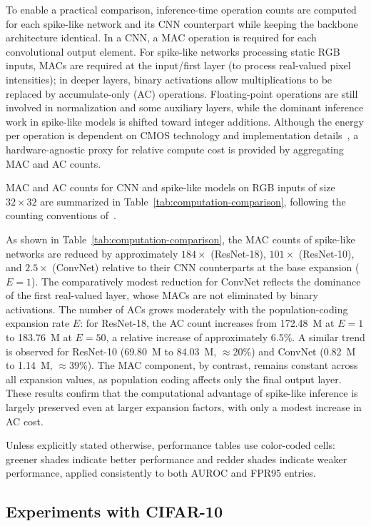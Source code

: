 \documentclass{ieeeaccess}
\begin{document}
To enable a practical comparison, inference-time operation counts are computed for each spike-like network and its CNN counterpart while keeping the backbone architecture identical. In a CNN, a MAC operation is required for each convolutional output element. For spike-like networks processing static RGB inputs, MACs are required at the input/first layer (to process real-valued pixel intensities); in deeper layers, binary activations allow multiplications to be replaced by accumulate-only (AC) operations. Floating-point operations are still involved in normalization and some auxiliary layers, while the dominant inference work in spike-like models is shifted toward integer additions. Although the energy per operation is dependent on CMOS technology and implementation details~\cite{lemaire2023estimation}, a hardware-agnostic proxy for relative compute cost is provided by aggregating MAC and AC counts.

MAC and AC counts for CNN and spike-like models on RGB inputs of size $32\times32$ are summarized in Table~\ref{tab:computation-comparison}, following the counting conventions of~\cite{ptflops, lemaire2023estimation}.

As shown in Table~\ref{tab:computation-comparison}, the MAC counts of spike-like networks are reduced by approximately $184\times$ (ResNet-18), $101\times$ (ResNet-10), and $2.5\times$ (ConvNet) relative to their CNN counterparts at the base expansion ($E=1$). The comparatively modest reduction for ConvNet reflects the dominance of the first real-valued layer, whose MACs are not eliminated by binary activations. The number of ACs grows moderately with the population-coding expansion rate $E$: for ResNet-18, the AC count increases from 172.48~M at $E=1$ to 183.76~M at $E=50$, a relative increase of approximately 6.5\%. A similar trend is observed for ResNet-10 (69.80~M to 84.03~M, $\approx$20\%) and ConvNet (0.82~M to 1.14~M, $\approx$39\%). The MAC component, by contrast, remains constant across all expansion values, as population coding affects only the final output layer. These results confirm that the computational advantage of spike-like inference is largely preserved even at larger expansion factors, with only a modest increase in AC cost.

Unless explicitly stated otherwise, performance tables use color-coded cells: greener shades indicate better performance and redder shades indicate weaker performance, applied consistently to both AUROC and FPR95 entries.

\subsection{Experiments with CIFAR-10}
\end{document}
